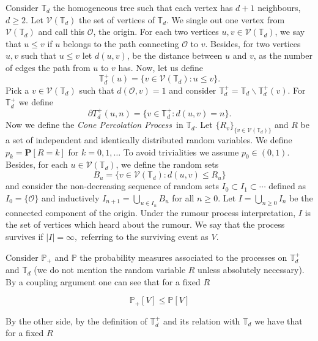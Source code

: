 \documentclass[12pt,reqno,oneside]{amsart}
\theoremstyle{plain}
\theoremstyle{definition}
\numberwithin{equation}{section}
\begin{document}
Consider ${{\mathbb T}}_d$ the homogeneous tree such that each vertex has 
$d+1$ neighbours, $d \ge 2$. Let ${\mathcal V}({{\mathbb T}}_d)$ the set of vertices of ${{\mathbb T}}_d$. We
single out one vertex from ${\mathcal V}({{\mathbb T}}_d)$ and call this ${\mathcal O}$, the origin. For each
two vertices $u,v \in {\mathcal V}({{\mathbb T}}_d)$, we say that $ u \leq v$ if $u$ belongs to the
path connecting ${\mathcal O}$ to $v$. Besides, for two vertices $u,v$ such that $u \leq v$
let $d(u,v)$, be the distance between $u$ and $v$, as the number of edges
the path from $u$ to $v$ has. Now, let us define
\[ {{\mathbb T}}^+_d(u) = \{v \in {\mathcal V}({{\mathbb T}}_d): u \leq v \}.\]
\noindent
Pick a $v \in {\mathcal V}({{\mathbb T}}_d)$ such that $d({\mathcal O},v)=1$ and consider 
${{\mathbb T}}^+_d = {{\mathbb T}}_d \backslash {{\mathbb T}}_d^+(v).$ For ${{\mathbb T}}^+_d$ we define 
\[ \partial T^+_d(u,n) = \{ v \in {{\mathbb T}}^+_d : d(u,v) = n\}.\]
Now we define the {\textit{Cone Percolation Process}}\ in ${{\mathbb T}}_d$. Let $\{R_v\}_{\{ v \in {\mathcal V}({{\mathbb T}}_d) \}}$ and $R$ 
be a set of independent and identically distributed random variables. We define
$p_k = {{\mathbf P}}[R = k]$ for $k=0,1,\dots$ To avoid trivialities we assume $p_0 \in (0,1).$
Besides, for each $u \in {\mathcal V}({{\mathbb T}}_d)$, we define the random sets
\begin{equation}
\label{E: defBu}
B_u = \{v \in {\mathcal V}({{\mathbb T}}_d): d(u,v) \leq R_u\}
\end{equation}
\noindent
and consider the non-decreasing sequence of random sets $I_0 \subset I_1 \subset \cdots$
defined as $ I_0 = \{{\mathcal O}\} $ and inductively $I_{n+1} = \bigcup_{u \in I_n} B_u$ 
for all $ n \geq 0.$ Let $ I = \bigcup_{n \geq 0} I_n$ be the connected component of the
origin. Under the rumour process interpretation, $I$ is the set of vertices
which heard about the rumour. We say that the process survives if $|I|=\infty,$ 
referring to the surviving event as $V.$

Consider ${{\mathbb P}}_+$ and ${{\mathbb P}}$ the probability measures associated to the processes on ${{\mathbb T}}_d^+$ and ${{\mathbb T}}_d$
(we do not mention the random variable $R$ unless absolutely necessary). By
a coupling argument one can see that for a fixed $R$

\begin{equation}
{{\mathbb P}}_+[V] \leq {{\mathbb P}}[V]
\end{equation}

By the other side, by the definition of ${{\mathbb T}}_d^+$ and its relation with ${{\mathbb T}}_d$ we have that
for a fixed $R$
\end{document}
